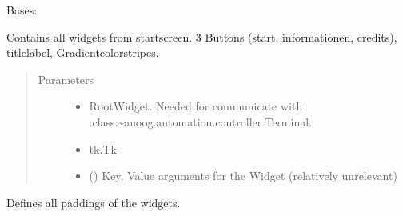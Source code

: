\documentclass[letterpaper,10pt,english]{sphinxmanual}
\begin{document}

\begin{fulllineitems}
\label{\detokenize{anoog.automation:anoog.automation.graphical_user_interface.Menu}}
\sphinxAtStartPar
Bases: {\hyperref[\detokenize{anoog.automation:anoog.automation.graphical_user_interface.Screen}]{}}

\sphinxAtStartPar
Contains all widgets from start\sphinxhyphen{}screen. 3 Buttons (start, informationen, credits), title\sphinxhyphen{}label, Gradientcolor\sphinxhyphen{}stripes.
\begin{quote}\begin{description}
\item[{Parameters}] \leavevmode\begin{itemize}
\item {} 
\sphinxAtStartPar
{} \textendash{} Root\sphinxhyphen{}Widget. Needed for communicate with :class:\textasciitilde{}anoog.automation.controller.Terminal.

\item {} 
\sphinxAtStartPar
{} \textendash{} tk.Tk

\item {} 
\sphinxAtStartPar
{} () \textendash{} Key, Value arguments for the Widget (relatively unrelevant)

\end{itemize}

\end{description}\end{quote}

\begin{fulllineitems}
\label{\detokenize{anoog.automation:anoog.automation.graphical_user_interface.Menu.add_padding}}
\sphinxAtStartPar
Defines all paddings of the widgets.


\end{fulllineitems}
\end{fulllineitems}
\end{document}
